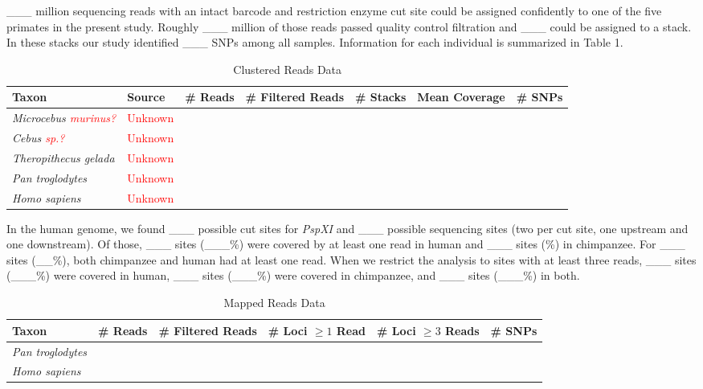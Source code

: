 \documentclass[12pt]{article}
\begin{document}

\_\_\_ million sequencing reads with an intact barcode and restriction enzyme cut site could be assigned confidently to one of the five primates in the present study. Roughly \_\_\_ million of those reads passed quality control filtration and \_\_\_ could be assigned to a stack. In these stacks our study identified \_\_\_ SNPs among all samples. Information for each individual is summarized in Table 1. 

\begin{table}[h]
\caption{Clustered Reads Data}
\begin{center}
	\small
	\begin{tabular}{ p{3cm} || l || p{1.75cm} | p{1.75cm} || p{1.75cm} | p{1.75cm} | l }
		\hline
		Taxon & Source & \# Reads & \# Filtered Reads & \# Stacks & Mean Coverage & \# SNPs \\ \hline\hline
		\emph{Microcebus \textcolor{red}{murinus?}} & \textcolor{red}{Unknown} &  &  &  &  &  \\ \hline
		\emph{Cebus \textcolor{red}{sp.?}} & \textcolor{red}{Unknown} &  &  &  &  &  \\ \hline
		\emph{Theropithecus gelada} & \textcolor{red}{Unknown} &  &  &  &  &  \\ \hline
		\emph{Pan troglodytes} & \textcolor{red}{Unknown} &  &  &  &  &  \\ \hline
		\emph{Homo sapiens} & \textcolor{red}{Unknown} &  &  &  &  &  \\ \hline
		\hline
	\end{tabular}
\end{center}
\end{table}

In the human genome, we found \_\_\_ possible cut sites for \emph{PspXI} and \_\_\_ possible sequencing sites (two per cut site, one upstream and one downstream). Of those, \_\_\_ sites (\_\_\_\%) were covered by at least one read in human and \_\_\_ sites (\%) in chimpanzee. For \_\_\_ sites (\_\_\%), both chimpanzee and human had at least one read. When we restrict the analysis to sites with at least three reads, \_\_\_ sites (\_\_\_\%) were covered in human, \_\_\_ sites (\_\_\_\%) were covered in chimpanzee, and \_\_\_ sites (\_\_\_\%) in both.

\begin{table}[h]
\caption{Mapped Reads Data}
\begin{center}
	\small
	\begin{tabular}{ p{3cm} || p{1.75cm} | p{1.75cm} || p{1.75cm} | p{1.75cm} | l }
		\hline
		Taxon & \# Reads & \# Filtered Reads & \# Loci $\ge 1$ Read & \# Loci $\ge 3$ Reads & \# SNPs \\ \hline\hline
		\emph{Pan troglodytes} &  &  &  &  &  \\ \hline
		\emph{Homo sapiens} &  &  &  &  &  \\ \hline
		\hline
	\end{tabular}
\end{center}
\end{table}
\end{document}
